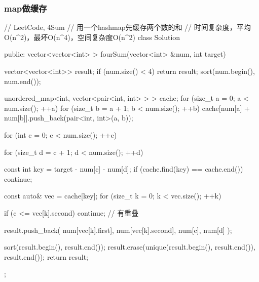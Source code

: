 \subsubsection{map做缓存}
\begin{Code}
// LeetCode, 4Sum
// 用一个hashmap先缓存两个数的和
// 时间复杂度，平均O(n^2)，最坏O(n^4)，空间复杂度O(n^2)
class Solution {
public:
    vector<vector<int> > fourSum(vector<int> &num, int target) {
        vector<vector<int>> result;
        if (num.size() < 4) return result;
        sort(num.begin(), num.end());

        unordered_map<int, vector<pair<int, int> > > cache;
        for (size_t a = 0; a < num.size(); ++a) {
            for (size_t b = a + 1; b < num.size(); ++b) {
                cache[num[a] + num[b]].push_back(pair<int, int>(a, b));
            }
        }

        for (int c = 0; c < num.size(); ++c) {
            for (size_t d = c + 1; d < num.size(); ++d) {
                const int key = target - num[c] - num[d];
                if (cache.find(key) == cache.end()) continue;

                const auto& vec = cache[key];
                for (size_t k = 0; k < vec.size(); ++k) {
                    if (c <= vec[k].second)
                        continue; // 有重叠

                    result.push_back( { num[vec[k].first],
                            num[vec[k].second], num[c], num[d] });
                }
            }
        }
        sort(result.begin(), result.end());
        result.erase(unique(result.begin(), result.end()), result.end());
        return result;
    }
};
\end{Code}


